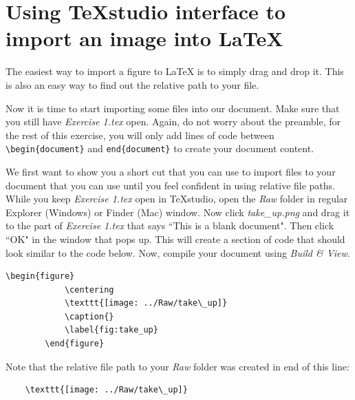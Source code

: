 \documentclass[12pts]{article}
\begin{document}
	\section{Using TeXstudio interface to import an image into \LaTeX}
	
	\begin{tcolorbox}[colback=white,colframe=orange,title=\textbf{Read first}]
		The easiest way to import a figure to {\LaTeX} is to simply drag and drop it. This is also an easy way to find out the relative path to your file.
	\end{tcolorbox}

	Now it is time to start importing some files into our document. Make sure that you still have \emph{Exercise 1.tex} open. Again, do not worry about the preamble, for the rest of this exercise, you will only add lines of code between \verb|\begin{document}| and \verb|end{document}| to create your document content.
	
	We first want to show you a short cut that you can use to import files to your document that you can use until you feel confident in using relative file paths. While you keep \emph{Exercise 1.tex} open in TeXstudio, open the \emph{Raw} folder in regular Explorer (Windows) or Finder (Mac) window. Now click \emph{take\_up.png} and drag it to the part of \emph{Exercise 1.tex} that says ``This is a blank document". Then click ``OK" in the window that pops up. This will create a section of code that should look similar to the code below. Now, compile your document using \emph{Build \& View}.
	
	\begin{center}
		\begin{Verbatim}[commandchars=+\(\)]
		\begin{figure}
			\centering
			\texttt{[image: ../Raw/take\_up]}
			\caption{}
			\label{fig:take_up}
		\end{figure}
		\end{Verbatim}
	\end{center}
	
	Note that the relative file path to your \emph{Raw} folder was created in end of this line:
	
	\begin{Verbatim}
	\texttt{[image: ../Raw/take\_up]}
	\end{Verbatim}
	
\end{document}
